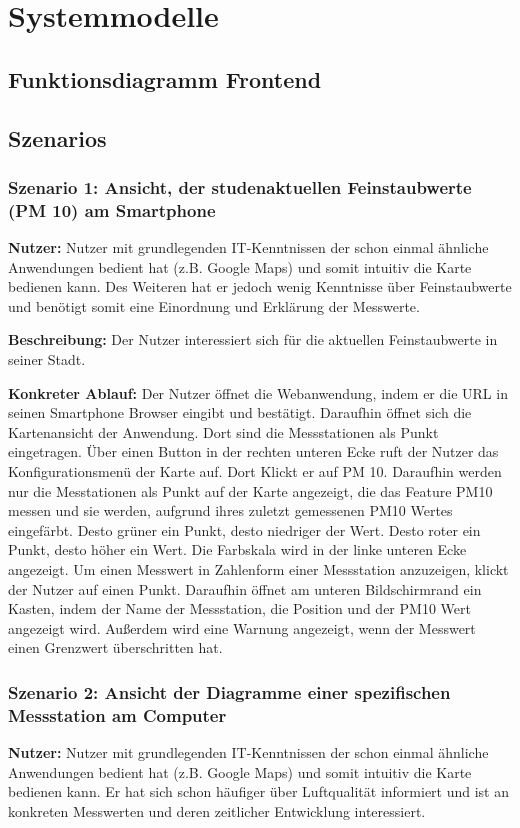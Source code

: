 \section{Systemmodelle}

\subsection{Funktionsdiagramm Frontend}

\subsection{Szenarios}

\subsubsection{Szenario 1: Ansicht, der studenaktuellen Feinstaubwerte (PM 10) am Smartphone}
\textbf{Nutzer:} Nutzer mit grundlegenden IT-Kenntnissen der schon einmal ähnliche Anwendungen bedient hat (z.B. Google Maps) und somit intuitiv die Karte bedienen kann. Des Weiteren hat er jedoch wenig Kenntnisse über Feinstaubwerte und benötigt somit eine Einordnung und Erklärung der Messwerte.

\textbf{Beschreibung:} Der Nutzer interessiert sich für die aktuellen Feinstaubwerte in seiner Stadt.

\textbf{Konkreter Ablauf:}
Der Nutzer öffnet die Webanwendung, indem er die URL in seinen Smartphone Browser eingibt und bestätigt. Daraufhin öffnet sich die Kartenansicht der Anwendung. Dort sind die Messstationen als Punkt eingetragen. Über einen Button in der rechten unteren Ecke ruft der Nutzer das Konfigurationsmenü der Karte auf. Dort Klickt er auf PM 10. Daraufhin werden nur die Messtationen als Punkt auf der Karte angezeigt, die das Feature PM10 messen und sie werden, aufgrund ihres zuletzt gemessenen PM10 Wertes eingefärbt. Desto grüner ein Punkt, desto niedriger der Wert. Desto roter ein Punkt, desto höher ein Wert. Die Farbskala wird in der linke unteren Ecke angezeigt.
Um einen Messwert in Zahlenform einer Messstation anzuzeigen, klickt der Nutzer auf einen Punkt. Daraufhin öffnet am unteren Bildschirmrand ein Kasten, indem der Name der Messstation, die Position und der PM10 Wert angezeigt wird. Außerdem wird eine Warnung angezeigt, wenn der Messwert einen Grenzwert überschritten hat.

\subsubsection{Szenario 2: Ansicht der Diagramme einer spezifischen Messstation am Computer}
\textbf{Nutzer:} Nutzer mit grundlegenden IT-Kenntnissen der schon einmal ähnliche Anwendungen bedient hat (z.B. Google Maps) und somit intuitiv die Karte bedienen kann. Er hat sich schon häufiger über Luftqualität informiert und ist an konkreten Messwerten und deren zeitlicher Entwicklung interessiert.

